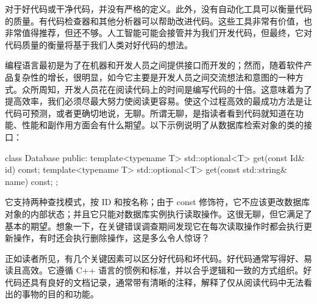 对于好代码或干净代码，并没有严格的定义。此外，没有自动化工具可以衡量代码的质量。有代码检查器和其他分析器可以帮助改进代码。这些工具非常有价值，也非常值得推荐，但还不够。人工智能可能会接管并为我们开发代码，但最终，它对代码质量的衡量将基于我们人类对好代码的想法。

编程语言最初是为了在机器和开发人员之间提供接口而开发的；然而，随着软件产品复杂性的增长，很明显，如今它主要是开发人员之间交流想法和意图的一种方式。众所周知，开发人员花在阅读代码上的时间是编写代码的十倍。这意味着为了提高效率，我们必须尽最大努力使阅读更容易。使这个过程高效的最成功方法是让代码可预测，或者更确切地说，无聊。所谓无聊，是指读者看到代码就知道在功能、性能和副作用方面会有什么期望。以下示例说明了从数据库检索对象的类的接口：

\begin{cpp}
class Database {
public:
    template<typename T>
    std::optional<T> get(const Id& id) const;
    template<typename T>
    std::optional<T> get(const std::string& name) const;
};
\end{cpp}

它支持两种查找模式，按 ID 和按名称；由于 const 修饰符，它不应该更改数据库对象的内部状态；并且它只能对数据库实例执行读取操作。这很无聊，但它满足了基本的期望。想象一下，在关键错误调查期间发现它在每次读取操作时都会执行更新操作，有时还会执行删除操作，这是多么令人惊讶？

正如读者所见，有几个关键因素可以区分好代码和坏代码。好代码通常写得好、易读且高效。它遵循 C++ 语言的惯例和标准，并以合乎逻辑和一致的方式组织。好代码还具有良好的文档记录，通常带有清晰的注释，解释了仅从阅读代码中无法看出的事物的目的和功能。
